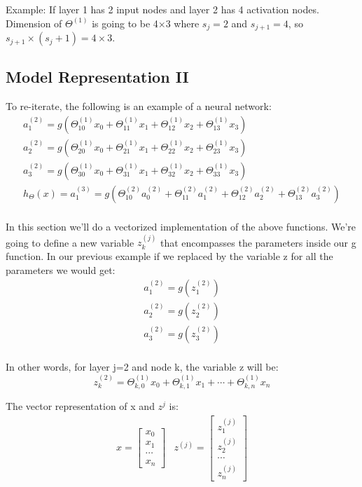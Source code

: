 \documentclass{article}
\begin{document}
Example: If layer 1 has 2 input nodes and layer 2 has 4 activation nodes. Dimension of $\Theta^{(1)}$ is going to be 4×3 where $s_j = 2$ and $s_{j+1} = 4$, so $s_{j+1} \times (s_j + 1) = 4 \times 3$.

\subsection{Model Representation II}
To re-iterate, the following is an example of a neural network:
\begin{align*} 
	a_1^{(2)} = g(\Theta_{10}^{(1)}x_0 + \Theta_{11}^{(1)}x_1 + \Theta_{12}^{(1)}x_2 + \Theta_{13}^{(1)}x_3) \\ 
	a_2^{(2)} = g(\Theta_{20}^{(1)}x_0 + \Theta_{21}^{(1)}x_1 + \Theta_{22}^{(1)}x_2 + \Theta_{23}^{(1)}x_3) \\
	a_3^{(2)} = g(\Theta_{30}^{(1)}x_0 + \Theta_{31}^{(1)}x_1 + \Theta_{32}^{(1)}x_2 + \Theta_{33}^{(1)}x_3) \\ 
	h_\Theta(x) = a_1^{(3)} = g(\Theta_{10}^{(2)}a_0^{(2)} + \Theta_{11}^{(2)}a_1^{(2)} + \Theta_{12}^{(2)}a_2^{(2)} + \Theta_{13}^{(2)}a_3^{(2)}) \\ 
\end{align*}

In this section we'll do a vectorized implementation of the above functions. We're going to define a new variable $z_k^{(j)}$  that encompasses the parameters inside our g function. In our previous example if we replaced by the variable z for all the parameters we would get:
\begin{align*}
	a_1^{(2)} = g(z_1^{(2)}) \\ 
	a_2^{(2)} = g(z_2^{(2)}) \\ 
	a_3^{(2)} = g(z_3^{(2)}) \\ 
\end{align*}

In other words, for layer j=2 and node k, the variable z will be:
$$z_k^{(2)} = \Theta_{k,0}^{(1)}x_0 + \Theta_{k,1}^{(1)}x_1 + \cdots + \Theta_{k,n}^{(1)}x_n$$

The vector representation of x and $z^j$ is:
\begin{align*}
	x = \begin{bmatrix}x_0 \\ x_1 \\ \cdots \\ x_n\end{bmatrix} 
	&z^{(j)} = \begin{bmatrix}z_1^{(j)} \\ z_2^{(j)} \\ \cdots \\ z_n^{(j)} \end{bmatrix}
\end{align*}
\end{document}
